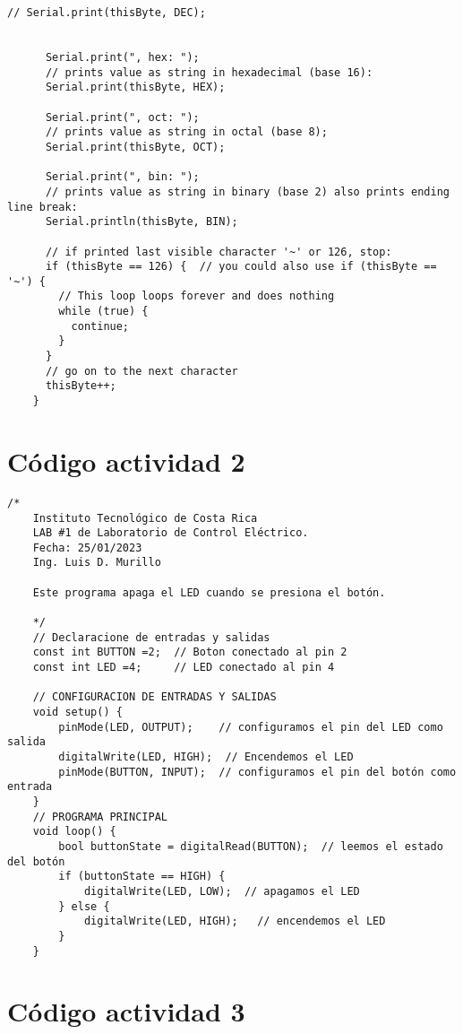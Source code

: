 {\begin{lstlisting}[language=Arduino,numbers=none, showstringspaces=false]
      // Serial.print(thisByte, DEC);
    
    
      Serial.print(", hex: ");
      // prints value as string in hexadecimal (base 16):
      Serial.print(thisByte, HEX);
    
      Serial.print(", oct: ");
      // prints value as string in octal (base 8);
      Serial.print(thisByte, OCT);
    
      Serial.print(", bin: ");
      // prints value as string in binary (base 2) also prints ending line break:
      Serial.println(thisByte, BIN);
    
      // if printed last visible character '~' or 126, stop:
      if (thisByte == 126) {  // you could also use if (thisByte == '~') {
        // This loop loops forever and does nothing
        while (true) {
          continue;
        }
      }
      // go on to the next character
      thisByte++;
    }
    \end{lstlisting}
}



\section{Código actividad 2}
\label{ApendiceB}
{\scriptsize 
    \begin{lstlisting}[language=Arduino,numbers=none, showstringspaces=false]
    /*
    Instituto Tecnológico de Costa Rica
    LAB #1 de Laboratorio de Control Eléctrico.
    Fecha: 25/01/2023
    Ing. Luis D. Murillo
    
    Este programa apaga el LED cuando se presiona el botón. 
    
    */
    // Declaracione de entradas y salidas
    const int BUTTON =2;  // Boton conectado al pin 2
    const int LED =4;     // LED conectado al pin 4
    
    // CONFIGURACION DE ENTRADAS Y SALIDAS
    void setup() {
        pinMode(LED, OUTPUT);    // configuramos el pin del LED como salida
        digitalWrite(LED, HIGH);  // Encendemos el LED
        pinMode(BUTTON, INPUT);  // configuramos el pin del botón como entrada
    }
    // PROGRAMA PRINCIPAL
    void loop() {
        bool buttonState = digitalRead(BUTTON);  // leemos el estado del botón
        if (buttonState == HIGH) {
            digitalWrite(LED, LOW);  // apagamos el LED
        } else {
            digitalWrite(LED, HIGH);   // encendemos el LED
        }
    }
    \end{lstlisting}
}	


\section{Código actividad 3}

